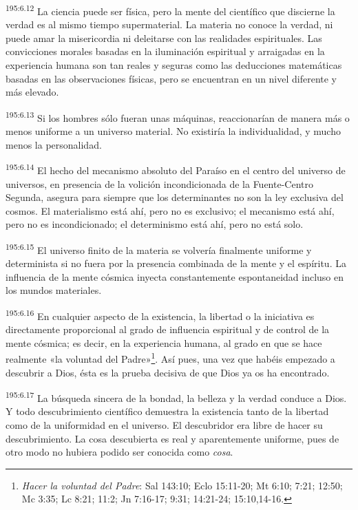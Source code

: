 \par
\textsuperscript{195:6.12} La ciencia puede ser física, pero la mente del científico que discierne la verdad es al mismo tiempo supermaterial. La materia no conoce la verdad, ni puede amar la misericordia ni deleitarse con las realidades espirituales. Las convicciones morales basadas en la iluminación espiritual y arraigadas en la experiencia humana son tan reales y seguras como las deducciones matemáticas basadas en las observaciones físicas, pero se encuentran en un nivel diferente y más elevado.

\par
\textsuperscript{195:6.13} Si los hombres sólo fueran unas máquinas, reaccionarían de manera más o menos uniforme a un universo material. No existiría la individualidad, y mucho menos la personalidad.

\par
\textsuperscript{195:6.14} El hecho del mecanismo absoluto del Paraíso en el centro del universo de universos, en presencia de la volición incondicionada de la Fuente-Centro Segunda, asegura para siempre que los determinantes no son la ley exclusiva del cosmos. El materialismo está ahí, pero no es exclusivo; el mecanismo está ahí, pero no es incondicionado; el determinismo está ahí, pero no está solo.

\par
\textsuperscript{195:6.15} El universo finito de la materia se volvería finalmente uniforme y determinista si no fuera por la presencia combinada de la mente y el espíritu. La influencia de la mente cósmica inyecta constantemente espontaneidad incluso en los mundos materiales.

\par
\textsuperscript{195:6.16} En cualquier aspecto de la existencia, la libertad o la iniciativa es directamente proporcional al grado de influencia espiritual y de control de la mente cósmica; es decir, en la experiencia humana, al grado en que se hace realmente «la voluntad del Padre»\footnote{\textit{Hacer la voluntad del Padre}: Sal 143:10; Eclo 15:11-20; Mt 6:10; 7:21; 12:50; Mc 3:35; Lc 8:21; 11:2; Jn 7:16-17; 9:31; 14:21-24; 15:10,14-16.}. Así pues, una vez que habéis empezado a descubrir a Dios, ésta es la prueba decisiva de que Dios ya os ha encontrado.

\par
\textsuperscript{195:6.17} La búsqueda sincera de la bondad, la belleza y la verdad conduce a Dios. Y todo descubrimiento científico demuestra la existencia tanto de la libertad como de la uniformidad en el universo. El descubridor era libre de hacer su descubrimiento. La cosa descubierta es real y aparentemente uniforme, pues de otro modo no hubiera podido ser conocida como \textit{cosa}.

